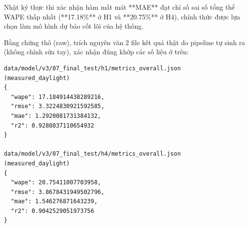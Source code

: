 \documentclass[12pt,a4paper]{article}
\begin{document}
\begin{table}[H]
\centering
\caption{Đối sánh Siêu tham số Optuna và Kết quả Thực nghiệm giữa 3 Hàm Mất Mát (Trích xuất từ Log Notebook \texttt{07\_final\_test.ipynb}). \textbf{In đậm} chỉ số tối ưu.}
\label{tab:benchmark_loss_val}
\end{table}

Nhật ký thực thi xác nhận hàm mất mát **MAE** đạt chỉ số sai số tổng thể WAPE thấp nhất (**17.18\%** ở H1 và **20.75\%** ở H4), chính thức được lựa chọn làm mô hình dự báo cốt lõi của hệ thống.

Bằng chứng thô (raw), trích nguyên văn 2 file kết quả thật do pipeline tự sinh ra (không chỉnh sửa tay), xác nhận đúng khớp các số liệu ở trên:

\begin{verbatim}
data/model/v3/07_final_test/h1/metrics_overall.json  (measured_daylight)
{
  "wape": 17.184914438289216,
  "rmse": 3.3224830921592585,
  "mae": 1.2920081731384132,
  "r2": 0.9288037110654932
}

data/model/v3/07_final_test/h4/metrics_overall.json  (measured_daylight)
{
  "wape": 20.75411007703958,
  "rmse": 3.8678431949502796,
  "mae": 1.546276871643239,
  "r2": 0.9042529051973756
}
\end{verbatim}
\end{document}
